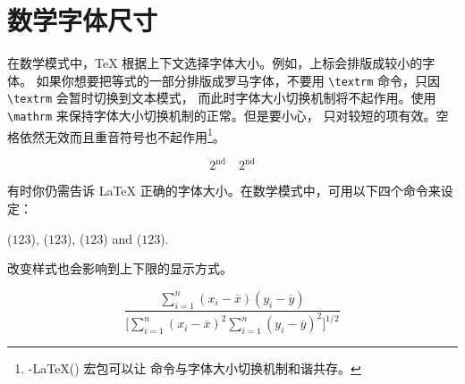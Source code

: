 \section{数学字体尺寸}\label{sec:fontsz}
在数学模式中，\TeX{} 根据上下文选择字体大小。例如，上标会排版成较小的字体。
如果你想要把等式的一部分排版成罗马字体，不要用 \verb|\textrm| 命令，只因 \verb|\textrm| 会暂时切换到文本模式，
而此时字体大小切换机制将不起作用。使用 \verb|\mathrm| 来保持字体大小切换机制的正常。但是要小心， 
只对较短的项有效。空格依然无效而且重音符号也不起作用\footnote{\AmS-\LaTeX{}() 宏包可以让  命令与字体大小切换机制和谐共存。}。




\begin{example}
\begin{equation}
2^{\textrm{nd}} \quad
2^{\mathrm{nd}}
\end{equation}
\end{example}

有时你仍需告诉 \LaTeX{} 正确的字体大小。在数学模式中，可用以下四个命令来设定：
\begin{flushleft}
 ($\displaystyle 123$),
  ($\textstyle 123$),
 ($\scriptstyle 123$) and
 ($\scriptscriptstyle 123$).
\end{flushleft}

改变样式也会影响到上下限的显示方式。
\begin{example}
\begin{displaymath}
 \frac{\displaystyle
   \sum_{i=1}^n(x_i-\overline x)
   (y_i-\overline y)}
  {\displaystyle\biggl[
 \sum_{i=1}^n(x_i-\overline x)^2
\sum_{i=1}^n(y_i-\overline y)^2
\biggr]^{1/2}}
\end{displaymath}
\end{example}

